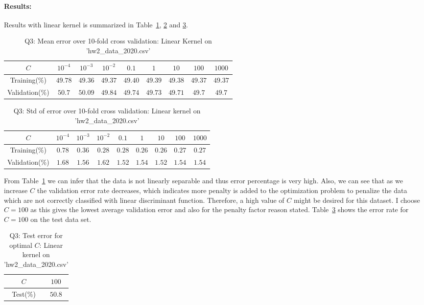 \paragraph{Results:}Results with linear kernel is summarized in Table~\ref{tbl:q3_mean_diff_c}, \ref{tbl:q3_std_diff_c} and \ref{tbl:q3_test_error}.
\begin{table}[ht]
	\centering
	\caption{Q3: Mean error over 10-fold cross validation: Linear Kernel on 'hw2\_data\_2020.csv'}
	\begin{tabular}[t]{ccccccccc} 
		\hline
		$C$ & $10^{-4}$ & $10^{-3}$ & $10^{-2}$ & $0.1$ & $1$ & $10$ & $100$ & $1000$\\ [0.5ex] 
		\hline
		Training(\%) & $49.78$ & $49.36$ & $49.37$ & $49.40$ & $49.39$ & $49.38$ & $49.37$ & $49.37$\\
		Validation(\%) & $50.7$ & $50.09$ & $49.84$ & $49.74$ & $49.73$ & $49.71$ & $49.7$ & $49.7$\\[1ex]
		\hline
	\end{tabular}
	\label{tbl:q3_mean_diff_c}
\end{table}
\begin{table}[ht]
	\centering
	\caption{Q3: Std of error over 10-fold cross validation: Linear kernel on 'hw2\_data\_2020.csv'}
	\begin{tabular}[t]{ccccccccc} 
		\hline
		$C$ & $10^{-4}$ & $10^{-3}$ & $10^{-2}$ & $0.1$ & $1$ & $10$ & $100$ & $1000$\\ [0.5ex] 
		\hline
		Training(\%) & $0.78$ & $0.36$ & $0.28$ & $0.28$ & $0.26$ & $0.26$ & $0.27$ & $0.27$\\
		Validation(\%) & $1.68$ & $1.56$ & $1.62$ & $1.52$ & $1.54$ & $1.52$ & $1.54$ & $1.54$\\[1ex]
		\hline
	\end{tabular}
	\label{tbl:q3_std_diff_c}
\end{table}
From Table~\ref{tbl:q3_mean_diff_c} we can infer that the data is not linearly separable and thus error percentage is very high. Also, we can see that as we increase $C$ the validation error rate decreases, which indicates more penalty is added to the optimization problem to penalize the data which are not correctly classified with linear discriminant function. Therefore, a high value of $C$ might be desired for this dataset. I choose $C=100$ as this gives the lowest average validation error and also for the penalty factor reason stated. Table~\ref{tbl:q3_test_error} shows the error rate for $C=100$ on the test data set.
\begin{table}[ht]
	\centering
	\caption{Q3: Test error for optimal $C$: Linear kernel on 'hw2\_data\_2020.csv'}
	\begin{tabular}[t]{cc} 
		\hline
		$C$ & $100$ \\ [0.5ex] 
		\hline
		Test(\%) & $50.8$\\[1ex]
		\hline
	\end{tabular}
	\label{tbl:q3_test_error}
\end{table}
